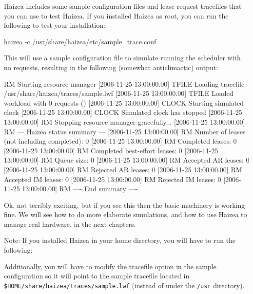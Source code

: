 Haizea includes some sample configuration files and lease request tracefiles that you can use to test Haizea. If you installed Haizea as root, you can run the following to test your installation:

\begin{shellverbatim}
haizea -c /usr/share/haizea/etc/sample_trace.conf
\end{shellverbatim}

This will use a sample configuration file to simulate running the scheduler with no requests, resulting in the following (somewhat anticlimactic) output:

\begin{wideshellverbatim}
[2006-11-25 13:00:00.00] RM      Starting resource manager
[2006-11-25 13:00:00.00] TFILE   Loading tracefile /usr/share/haizea/traces/sample.lwf
[2006-11-25 13:00:00.00] TFILE   Loaded workload with 0 requests ()
[2006-11-25 13:00:00.00] CLOCK   Starting simulated clock
[2006-11-25 13:00:00.00] CLOCK   Simulated clock has stopped
[2006-11-25 13:00:00.00] RM      Stopping resource manager gracefully...
[2006-11-25 13:00:00.00] RM      --- Haizea status summary ---
[2006-11-25 13:00:00.00] RM      Number of leases (not including completed): 0
[2006-11-25 13:00:00.00] RM      Completed leases: 0
[2006-11-25 13:00:00.00] RM      Completed best-effort leases: 0
[2006-11-25 13:00:00.00] RM      Queue size: 0
[2006-11-25 13:00:00.00] RM      Accepted AR leases: 0
[2006-11-25 13:00:00.00] RM      Rejected AR leases: 0
[2006-11-25 13:00:00.00] RM      Accepted IM leases: 0
[2006-11-25 13:00:00.00] RM      Rejected IM leases: 0
[2006-11-25 13:00:00.00] RM      ---- End summary ----
\end{wideshellverbatim}

Ok, not terribly exciting, but if you see this then the basic machinery is working fine. We will see how to do more elaborate simulations, and how to use Haizea to manage real hardware, in the next chapters.

Note: If you installed Haizea in your home directory, you will have to run the following:


Additionally, you will have to modify the tracefile option in the sample configuration so it will point to the sample tracefile located in \texttt{\$HOME/share/haizea/traces/sample.lwf} (instead of under the \texttt{/usr} directory).
